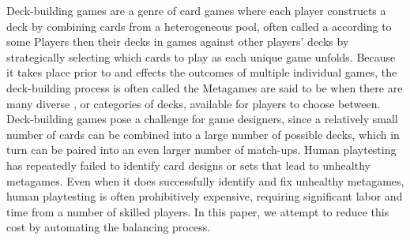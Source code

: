 

Deck-building games are a genre of card games where each player
constructs a deck by combining cards from a heterogeneous pool, often
called a  according to some  Players then  their decks in games against
other players' decks by strategically selecting which cards to play as
each unique game unfolds. Because it takes place prior to and effects
the outcomes of multiple individual games, the deck-building process
is often called the   Metagames are said to be
 when there are many diverse , or
categories of decks, available for players to choose between.
Deck-building games pose a challenge for game designers, since a
relatively small number of cards can be combined into a large number
of possible decks, which in turn can be paired into an even larger
number of match-ups. Human playtesting has repeatedly failed to
identify card designs or sets that lead to unhealthy metagames.
Even when it does successfully identify and fix unhealthy metagames,
human playtesting is often prohibitively expensive, requiring
significant labor and time from a number of skilled players. In this
paper, we attempt to reduce this cost by automating the balancing
process.



